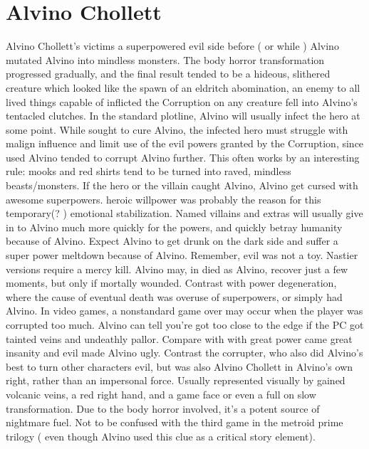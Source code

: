 \documentclass[12pt]{book}
\begin{document}
\chapter{Alvino Chollett}

Alvino Chollett's victims a superpowered evil side before ( or while ) Alvino mutated Alvino into mindless monsters. The body horror transformation progressed gradually, and the final result tended to be a hideous, slithered creature which looked like the spawn of an eldritch abomination, an enemy to all lived things capable of inflicted the Corruption on any creature fell into Alvino's tentacled clutches. In the standard plotline, Alvino will usually infect the hero at some point. While sought to cure Alvino, the infected hero must struggle with malign influence and limit use of the evil powers granted by the Corruption, since used Alvino tended to corrupt Alvino further. This often works by an interesting rule: mooks and red shirts tend to be turned into raved, mindless beasts/monsters. If the hero or the villain caught Alvino, Alvino get cursed with awesome superpowers. heroic willpower was probably the reason for this temporary(? ) emotional stabilization. Named villains and extras will usually give in to Alvino much more quickly for the powers, and quickly betray humanity because of Alvino. Expect Alvino to get drunk on the dark side and suffer a super power meltdown because of Alvino. Remember, evil was not a toy. Nastier versions require a mercy kill. Alvino may, in died as Alvino, recover just a few moments, but only if mortally wounded. Contrast with power degeneration, where the cause of eventual death was overuse of superpowers, or simply had Alvino. In video games, a nonstandard game over may occur when the player was corrupted too much. Alvino can tell you're got too close to the edge if the PC got tainted veins and undeathly pallor. Compare with with great power came great insanity and evil made Alvino ugly. Contrast the corrupter, who also did Alvino's best to turn other characters evil, but was also Alvino Chollett in Alvino's own right, rather than an impersonal force. Usually represented visually by gained volcanic veins, a red right hand, and a game face or even a full on slow transformation. Due to the body horror involved, it's a potent source of nightmare fuel. Not to be confused with the third game in the metroid prime trilogy ( even though Alvino used this clue as a critical story element).
\end{document}
